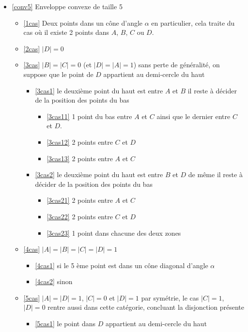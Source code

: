 \begin{itemize}
	\item \ref{conv5} Enveloppe convexe de taille 5
	\begin{itemize}
		\item \ref{1cas} Deux points dans un cône d'angle $\alpha$
		en particulier, cela traite du cas où il existe 2 points dans $A$, $B$, $C$ ou $D$.
		\item \ref{2cas} $|D| = 0$
		\item \ref{3cas} $|B| = |C| = 0$ (et $|D| = |A| = 1$)
		sans perte de généralité, on suppose que le point de $D$ appartient au demi-cercle du haut
		\begin{itemize}
			\item \ref{3cas1} le deuxième point du haut est entre $A$ et $B$
			il reste à décider de la position des points du bas
			\begin{itemize}
				\item \ref{3cas11} 1 point du bas entre $A$ et $C$ ainsi que le dernier entre $C$ et $D$.
				\item \ref{3cas12} 2 points entre $C$ et $D$
				\item \ref{3cas13} 2 points entre $A$ et $C$
			\end{itemize}
			\item \ref{3cas2} le deuxième point du haut est entre $B$ et $D$
			de même il reste à décider de la position des points du bas
			\begin{itemize}
				\item \ref{3cas21} 2 points entre $A$ et $C$
				\item \ref{3cas22} 2 points entre $C$ et $D$
				\item \ref{3cas23} 1 point dans chacune des deux zones
			\end{itemize}
		\end{itemize}
		\item \ref{4cas} $|A| = |B| = |C| = |D| = 1$
		\begin{itemize}
			\item \ref{4cas1} si le 5 ème point est dans un cône diagonal d'angle $\alpha$
			\item \ref{4cas2} sinon
		\end{itemize}
		\item \ref{5cas} $|A| = |D| = 1$, $|C| = 0$ et $|D| = 1$
		par symétrie, le cas $|C| = 1$, $|D| = 0$ rentre aussi dans cette catégorie, concluant la disjonction présente
		\begin{itemize}
			\item \ref{5cas1} le point dans $D$ appartient au demi-cercle du haut

\end{itemize}
\end{itemize}
\end{itemize}
